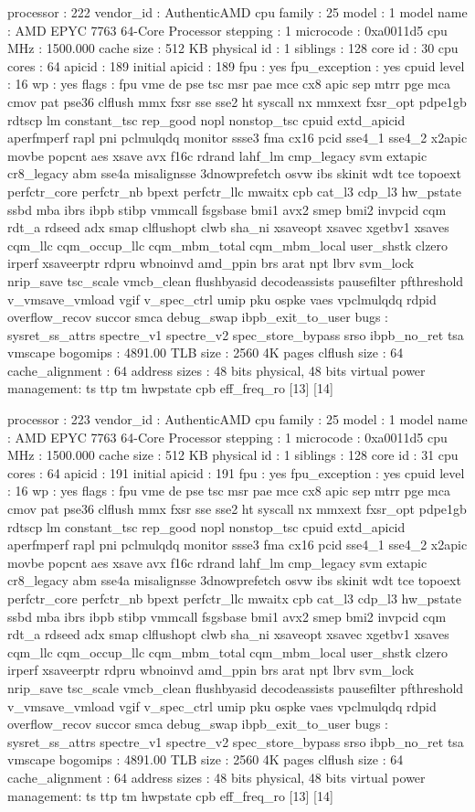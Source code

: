 processor	: 222
vendor_id	: AuthenticAMD
cpu family	: 25
model		: 1
model name	: AMD EPYC 7763 64-Core Processor
stepping	: 1
microcode	: 0xa0011d5
cpu MHz		: 1500.000
cache size	: 512 KB
physical id	: 1
siblings	: 128
core id		: 30
cpu cores	: 64
apicid		: 189
initial apicid	: 189
fpu		: yes
fpu_exception	: yes
cpuid level	: 16
wp		: yes
flags		: fpu vme de pse tsc msr pae mce cx8 apic sep mtrr pge mca cmov pat pse36 clflush mmx fxsr sse sse2 ht syscall nx mmxext fxsr_opt pdpe1gb rdtscp lm constant_tsc rep_good nopl nonstop_tsc cpuid extd_apicid aperfmperf rapl pni pclmulqdq monitor ssse3 fma cx16 pcid sse4_1 sse4_2 x2apic movbe popcnt aes xsave avx f16c rdrand lahf_lm cmp_legacy svm extapic cr8_legacy abm sse4a misalignsse 3dnowprefetch osvw ibs skinit wdt tce topoext perfctr_core perfctr_nb bpext perfctr_llc mwaitx cpb cat_l3 cdp_l3 hw_pstate ssbd mba ibrs ibpb stibp vmmcall fsgsbase bmi1 avx2 smep bmi2 invpcid cqm rdt_a rdseed adx smap clflushopt clwb sha_ni xsaveopt xsavec xgetbv1 xsaves cqm_llc cqm_occup_llc cqm_mbm_total cqm_mbm_local user_shstk clzero irperf xsaveerptr rdpru wbnoinvd amd_ppin brs arat npt lbrv svm_lock nrip_save tsc_scale vmcb_clean flushbyasid decodeassists pausefilter pfthreshold v_vmsave_vmload vgif v_spec_ctrl umip pku ospke vaes vpclmulqdq rdpid overflow_recov succor smca debug_swap ibpb_exit_to_user
bugs		: sysret_ss_attrs spectre_v1 spectre_v2 spec_store_bypass srso ibpb_no_ret tsa vmscape
bogomips	: 4891.00
TLB size	: 2560 4K pages
clflush size	: 64
cache_alignment	: 64
address sizes	: 48 bits physical, 48 bits virtual
power management: ts ttp tm hwpstate cpb eff_freq_ro [13] [14]

processor	: 223
vendor_id	: AuthenticAMD
cpu family	: 25
model		: 1
model name	: AMD EPYC 7763 64-Core Processor
stepping	: 1
microcode	: 0xa0011d5
cpu MHz		: 1500.000
cache size	: 512 KB
physical id	: 1
siblings	: 128
core id		: 31
cpu cores	: 64
apicid		: 191
initial apicid	: 191
fpu		: yes
fpu_exception	: yes
cpuid level	: 16
wp		: yes
flags		: fpu vme de pse tsc msr pae mce cx8 apic sep mtrr pge mca cmov pat pse36 clflush mmx fxsr sse sse2 ht syscall nx mmxext fxsr_opt pdpe1gb rdtscp lm constant_tsc rep_good nopl nonstop_tsc cpuid extd_apicid aperfmperf rapl pni pclmulqdq monitor ssse3 fma cx16 pcid sse4_1 sse4_2 x2apic movbe popcnt aes xsave avx f16c rdrand lahf_lm cmp_legacy svm extapic cr8_legacy abm sse4a misalignsse 3dnowprefetch osvw ibs skinit wdt tce topoext perfctr_core perfctr_nb bpext perfctr_llc mwaitx cpb cat_l3 cdp_l3 hw_pstate ssbd mba ibrs ibpb stibp vmmcall fsgsbase bmi1 avx2 smep bmi2 invpcid cqm rdt_a rdseed adx smap clflushopt clwb sha_ni xsaveopt xsavec xgetbv1 xsaves cqm_llc cqm_occup_llc cqm_mbm_total cqm_mbm_local user_shstk clzero irperf xsaveerptr rdpru wbnoinvd amd_ppin brs arat npt lbrv svm_lock nrip_save tsc_scale vmcb_clean flushbyasid decodeassists pausefilter pfthreshold v_vmsave_vmload vgif v_spec_ctrl umip pku ospke vaes vpclmulqdq rdpid overflow_recov succor smca debug_swap ibpb_exit_to_user
bugs		: sysret_ss_attrs spectre_v1 spectre_v2 spec_store_bypass srso ibpb_no_ret tsa vmscape
bogomips	: 4891.00
TLB size	: 2560 4K pages
clflush size	: 64
cache_alignment	: 64
address sizes	: 48 bits physical, 48 bits virtual
power management: ts ttp tm hwpstate cpb eff_freq_ro [13] [14]

